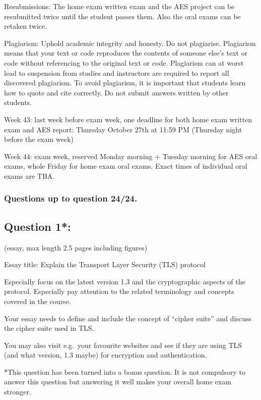 \documentclass[11pt]{article}
\begin{document}
Resubmissions: The home exam written exam and the AES project can be
resubmitted twice until the student passes them. Also the oral exams can
be retaken twice.

Plagiarism: Uphold academic integrity and honesty. Do not plagiarise.
Plagiarism means that your text or code reproduces the contents of
someone else's text or code without referencing to the original text or
code. Plagiarism can at worst lead to suspension from studies and
instructors are required to report all discovered plagiarism. To avoid
plagiarism, it is important that students learn how to quote and cite
correctly. Do not submit answers written by other students.

Week 43: last week before exam week, one deadline for both home exam
written exam and AES report: Thursday October 27th at 11:59 PM (Thursday
night before the exam week)

Week 44: exam week, reserved Monday morning + Tuesday morning for AES
oral exams, whole Friday for home exam oral exams. Exact times of
individual oral exams are TBA.

\hypertarget{questions-up-to-question-2424.}{%
\subsubsection{Questions up to question
24/24.}\label{questions-up-to-question-2424.}}

    \hypertarget{question-1}{%
\subsection{Question 1*:}\label{question-1}}

(essay, max length 2.5 pages including figures)

Essay title: Explain the Transport Layer Security (TLS) protocol

Especially focus on the latest version 1.3 and the cryptographic aspects
of the protocol. Especially pay attention to the related terminology and
concepts covered in the course.

Your essay needs to define and include the concept of ``cipher suite''
and discuss the cipher suite used in TLS.

You may also visit e.g.~your favourite websites and see if they are
using TLS (and what version, 1.3 maybe) for encryption and
authentication.

*This question has been turned into a bonus question. It is not
compulsory to answer this question but answering it well makes your
overall home exam stronger.
\end{document}
